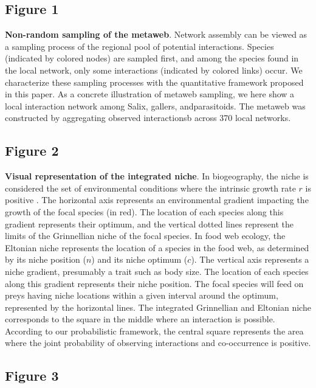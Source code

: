 \documentclass[12pt]{article}
\begin{document}
\subsection*{Figure 1}

\textbf{Non-random sampling of the metaweb}. Network assembly can be viewed as
a sampling process of the regional pool of potential interactions. Species
(indicated by colored nodes) are sampled first, and among the species found in
the local network, only some interactions (indicated by colored links) occur.
We characterize these sampling processes with the quantitative framework
proposed in this paper. As a concrete illustration of metaweb sampling, we
here show a local interaction network among Salix, gallers, andparasitoids.
The metaweb was constructed by aggregating observed interactionsb across 370
local networks. 

\subsection*{Figure 2}

\textbf{Visual representation of the integrated niche}. In biogeography, the
niche is considered the set of environmental conditions where the intrinsic
growth rate $r$ is positive \citep{Holt2009}. The horizontal axis represents an
environmental gradient impacting the growth of the focal species (in red). The
location of each species along this gradient represents their optimum, and the
vertical dotted lines represent the limits of the Grinnellian niche of the
focal species. In food web ecology, the Eltonian niche represents the location
of a species in the food web, as determined by its niche position ($n$) and its
niche optimum ($c$). The vertical axis represents a niche gradient, presumably a
trait such as body size. The location of each species along this gradient
represents their niche position. The focal species will feed on preys having
niche locations within a given interval around the optimum, represented by the
horizontal lines. The integrated Grinnellian and Eltonian niche corresponds to
the square in the middle where an interaction is possible. According to our
probabilistic framework, the central square represents the area where the
joint probability of observing interactions and co-occurrence is positive.

\subsection*{Figure 3}
\end{document}
